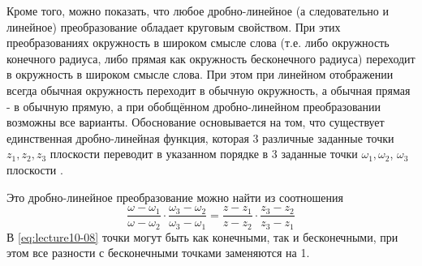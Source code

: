 Кроме того, можно показать, что любое дробно-линейное (а следовательно и линейное) преобразование
обладает круговым свойством. При этих преобразованиях окружность в широком смысле слова (т.е. либо
окружность конечного радиуса, либо прямая как окружность бесконечного радиуса) переходит в
окружность в широком смысле слова. При этом при линейном отображении всегда обычная окружность
переходит в обычную окружность, а обычная прямая - в обычную прямую, а при обобщённом
дробно-линейном преобразовании возможны все варианты. Обоснование основывается на том, что
существует единственная дробно-линейная функция, которая 3 различные заданные точки $z_1, z_2, z_3$
плоскости  переводит в указанном порядке в 3 заданные точки $\omega_1, \omega_2$, $\omega_3$ плоскости \circled{$\omega$}.

Это дробно-линейное преобразование можно найти из соотношения
\begin{equation}
  \label{eq:lecture10-08}
  \dfrac{\omega - \omega_1}{\omega - \omega_2}\cdot\dfrac{\omega_3 - \omega_2}{\omega_3 - \omega_1} =
  \dfrac{z - z_1}{z - z_2}\cdot\dfrac{z_3 - z_2}{z_3 - z_1}
\end{equation}
В \eqref{eq:lecture10-08} точки могут быть как конечными, так и бесконечными, при этом все разности
с бесконечными точками заменяются на 1.
